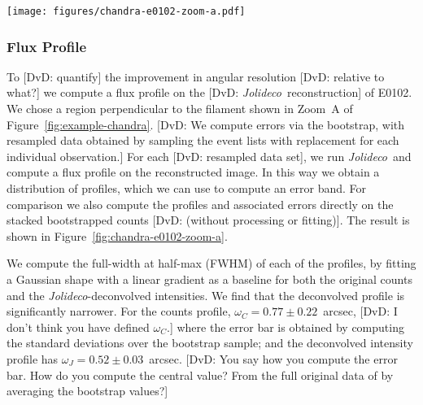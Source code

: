 \documentclass[twocolumn]{aastex631}
\newcommand{\jolideco}{\textit{Jolideco}~}
\newcommand{\jolideconospace}{\textit{Jolideco}}
\newcommand{\vlk}[1]{{\color{blue} [VLK: #1]}}
\newcommand{\dvd}[1]{{\color{red} [DvD: #1]}}
\begin{document}
    \begin{figure*}
        \begin{centering}
            \texttt{[image: figures/chandra-e0102-zoom-a.pdf]}
            \caption{
                The left panel shows the deconvolved flux and counts profile of the region illustrated in the right panel. The associated $3\sigma$ error band is shown transparent in the background. Both profiles are normalized such that they integrate to unity and are aligned such that the position of their peak coincides.
                \vlk{I notice that you avoid the bright knot to SW.  Any particular reason why?  You could legitimately exclude it to avoid pileup effects, but depends on the actual observed count rates.}
            }
            \label{fig:chandra-e0102-zoom-a}
        \end{centering}
    \end{figure*}
    
    \subsubsection{Flux Profile}
    To \dvd{quantify} %
    the improvement in angular resolution \dvd{relative to what?} we compute a flux profile on the \dvd{\jolideco reconstruction} %
    of E0102. %
    We chose a region perpendicular to the filament shown in Zoom~A of Figure~\ref{fig:example-chandra}. \dvd{We compute errors via the bootstrap, with resampled data obtained by sampling the event lists with replacement for each individual observation.}
    For each \dvd{resampled data set}, %
    we run \jolideco and compute a flux profile on the reconstructed image. In this way we obtain a distribution of profiles, which we can use to compute an error band. For comparison we also compute the profiles and associated errors directly on the stacked bootstrapped counts \dvd{(without processing or fitting)}. The result is shown in Figure~\ref{fig:chandra-e0102-zoom-a}.

    We compute the full-width at half-max (FWHM) of each of the profiles, by fitting a Gaussian shape with a linear gradient as a baseline 
    for both the original counts and the \jolideconospace-deconvolved intensities. We find that the deconvolved profile is significantly narrower. For the counts profile, $\omega_C=0.77 \pm 0.22$~arcsec, \dvd{I don't think you have defined $\omega_C$.} where the error bar is obtained by computing the standard deviations over the bootstrap sample; and the deconvolved intensity profile has $\omega_J=0.52 \pm 0.03$~arcsec. \dvd{You say how you compute the error bar. How do you compute the central value? From the full original data of by averaging the bootstrap values?}
\end{document}
